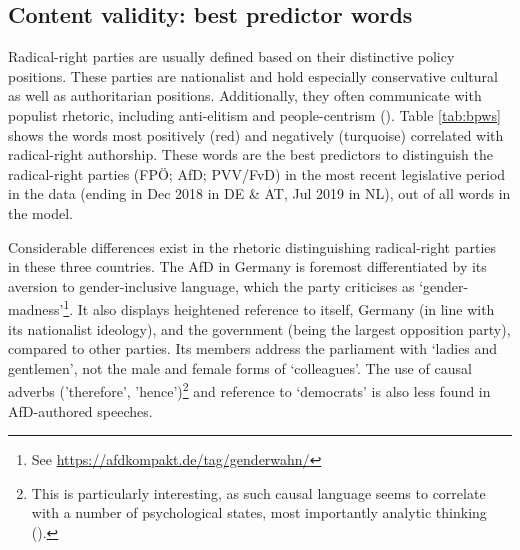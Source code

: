 \documentclass{article}
\begin{document}
\subsection{Content validity: best predictor words}

Radical-right parties are usually defined based on their distinctive policy positions. These parties are nationalist and hold especially conservative cultural as well as authoritarian positions. Additionally, they often communicate with populist rhetoric, including anti-elitism and people-centrism (\cite{Mudde2007}). Table \ref{tab:bpws} shows the words most positively (red) and negatively (turquoise) correlated with radical-right authorship. These words are the best predictors to distinguish the radical-right parties (FPÖ; AfD; PVV/FvD) in the most recent legislative period in the data (ending in Dec 2018 in DE \& AT, Jul 2019 in NL), out of all words in the model. \par

Considerable differences exist in the rhetoric distinguishing radical-right parties in these three countries. The AfD in Germany is foremost differentiated by its aversion to gender-inclusive language, which the party criticises as ‘gender-madness’\footnote{See \url{https://afdkompakt.de/tag/genderwahn/}}. It also displays heightened reference to itself, Germany (in line with its nationalist ideology), and the government (being the largest opposition party), compared to other parties. Its members address the parliament with ‘ladies and gentlemen’, not the male and female forms of ‘colleagues’. The use of causal adverbs ('therefore', 'hence')\footnote{This is particularly interesting, as such causal language seems to correlate with a number of psychological states, most importantly analytic thinking  (\cite{Pennebaker2003, Pennebaker2011}).} and reference to ‘democrats’ is also less found in AfD-authored speeches. \par
\end{document}
